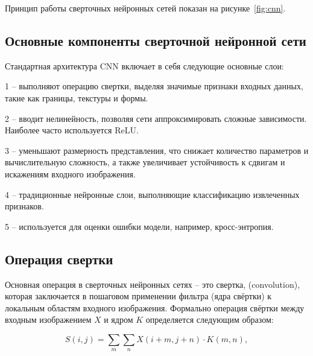 Принцип работы сверточных нейронных сетей показан на рисунке~\ref{fig:cnn}\cite{CNN}.


\subsection{Основные компоненты сверточной нейронной сети}
\hspace*{12.5 mm}Стандартная архитектура CNN включает в себя следующие основные 
слои:

    1  – выполняют операцию свертки, выделяя значимые 
признаки входных данных, такие как границы, текстуры и формы. 

    2  – вводит нелинейность, позволяя сети 
аппроксимировать сложные зависимости. Наиболее часто используется ReLU.\@

    3  – уменьшают размерность представления, 
что снижает количество параметров и вычислительную сложность, а также 
увеличивает устойчивость к сдвигам и искажениям входного изображения.

    4  – традиционные нейронные слои, выполняющие 
классификацию извлеченных признаков.

    5  – используется для оценки ошибки модели, например, 
кросс-энтропия.

\subsection{Операция свертки}
\hspace*{12.5 mm}Основная операция в сверточных нейронных сетях – это свертка, 
(convolution), которая заключается в пошаговом применении фильтра (ядра 
свёртки) к локальным областям входного изображения. Формально операция свёртки 
между входным изображением $X$ и ядром $K$ определяется следующим образом:

\begin{equation}
    S(i, j) = \sum_{m} \sum_{n} X(i+m, j+n) \cdot K(m, n),
\end{equation}

